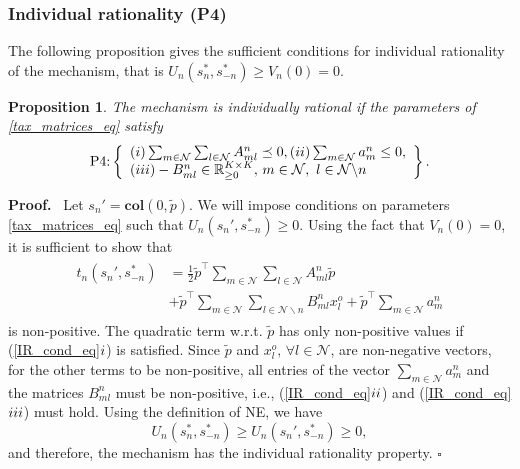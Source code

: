 \documentclass[twocolumn]{autart}
\newtheorem{proposition}{Proposition}
\newenvironment{proof}[1][Proof]{%
  \par\noindent\textbf{#1.}\ }{%
  \hfill$\square$\par
}
\begin{document}
\subsubsection{Individual rationality (P4)} The following proposition gives the sufficient conditions for individual rationality of the mechanism, that is $U_n(s_n^*,s_{-n}^*)\geq V_n(0)=0$.
\begin{proposition}\label{IR_prop}
    The mechanism is individually rational if the parameters of \eqref{tax_matrices_eq} satisfy
    \begin{equation}\label{IR_cond_eq}
        \textnormal{P4:} \left\{\begin{array}{l}
		 (\romannumeral 1) \sum_{m\in\mathcal{N}}{\sum_{l\in\mathcal{N}}{A_{ml}^n}}\preceq 0, (\romannumeral 2) \sum_{m\in\mathcal{N}}{a_{m}^n}\leq 0,\\
		 (\romannumeral 3) -B_{ml}^n\in\mathbb{R}_{\geq 0}^{K\times K}, \, m\in\mathcal{N}, \ l\in \mathcal{N}\backslash n\\
		\end{array}\right\}.
    \end{equation}
    
\end{proposition}
\begin{proof}
    Let $s_n'=\textbf{col}(0, \tilde{p})$. We will impose conditions on parameters \eqref{tax_matrices_eq} such that $U_n(s_n', s_{-n}^*)\geq 0$. Using the fact that $V_n(0)=0$, it is sufficient to show that 
    \begin{equation*}
    \begin{aligned}
        \begin{split}
            t_n(s_n', s_{-n}^*)&=\frac{1}{2}\tilde{p}^\top \sum_{m\in\mathcal{N}}{\sum_{l\in\mathcal{N}}{A_{ml}^n}}\tilde{p} \\&+ \tilde{p}^\top\sum_{m\in\mathcal{N}}{\sum_{l\in\mathcal{N}\backslash n}{B_{ml}^n x_l^o}} + \tilde{p}^\top\sum_{m\in\mathcal{N}}{a_m^n}
        \end{split}
    \end{aligned}
    \end{equation*}
    is non-positive. The quadratic term w.r.t. $\tilde{p}$ has only non-positive values if (\ref{IR_cond_eq}$\romannumeral 1$) is satisfied. Since $\tilde{p}$ and $x_l^o, \, \forall l\in\mathcal{N}$, are non-negative vectors, for the other terms to be non-positive, all entries of the vector $\sum_{m\in\mathcal{N}}{a_m^n}$ and the matrices $B_{ml}^n$ must be non-positive, i.e., (\ref{IR_cond_eq}$\romannumeral 2$) and (\ref{IR_cond_eq}$\romannumeral 3$) must hold. Using the definition of NE, we have \begin{equation}U_n(s_n^*, s_{-n}^*)\geq U_n(s_n',s_{-n}^*)\geq 0,\end{equation} and therefore, the mechanism has the individual rationality property.
\end{proof}
\end{document}
